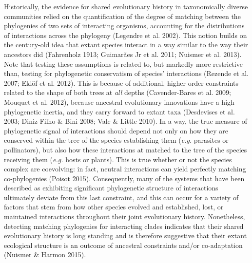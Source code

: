 \documentclass[12pt]{article}
\begin{document}
Historically, the evidence for shared evolutionary history in
taxonomically diverse communities relied on the quantification of the
degree of matching between the phylogenies of two sets of interacting
organisms, accounting for the distributions of interactions across the
phylogeny (Legendre et al. 2002). This notion builds on the century-old
idea that extant species interact in a way similar to the way their
ancestors did (Fahrenholz 1913; Guimarães Jr et al. 2011; Nuismer et al.
2013). Note that testing these assumptions is related to, but markedly
more restrictive than, testing for phylogenetic conservatism of species'
interactions (Rezende et al. 2007; Eklöf et al. 2012). This is because
of additional, higher-order constraints related to the shape of both
trees at \emph{all} depths (Cavender-Bares et al. 2009; Mouquet et al.
2012), because ancestral evolutionary innovations have a high
phylogenetic inertia, and they carry forward to extant taxa (Desdevises
et al. 2003; Diniz-Filho \& Bini 2008; Vale \& Little 2010). In a way,
the true measure of phylogenetic signal of interactions should depend
not only on how they are conserved within the tree of the species
establishing them (\emph{e.g.} parasites or pollinators), but also how
these interactions at matched to the tree of the species receiving them
(\emph{e.g.} hosts or plants). This is true whether or not the species
complex are coevolving: in fact, neutral interactions can yield
perfectly matching co-phylogenies (Poisot 2015). Consequently, many of
the systems that have been described as exhibiting significant
phylogenetic structure of interactions ultimately deviate from this last
constraint, and this can occur for a variety of factors that stem from
how other species evolved and established, lost, or maintained
interactions throughout their joint evolutionary history. Nonetheless,
detecting matching phylogenies for interacting clades indicates that
their shared evolutionary history is long standing and is therefore
suggestive that their extant ecological structure is an outcome of
ancestral constraints and/or co-adaptation (Nuismer \& Harmon 2015).
\end{document}
